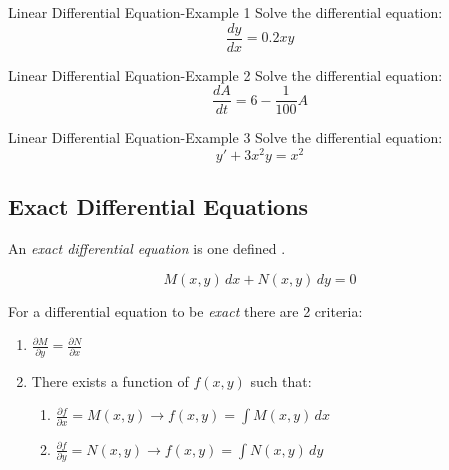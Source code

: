 \begin{example}[]{Linear Differential Equation-Example 1}
  Solve the differential equation:
  \begin{equation*}
    \frac{dy}{dx} = 0.2 xy
  \end{equation*}

  \tcblower

\end{example}

\begin{example}[]{Linear Differential Equation-Example 2}
  Solve the differential equation:
  \begin{equation*}
    \frac{dA}{dt} = 6 - \frac{1}{100} A
  \end{equation*}

  \tcblower

\end{example}

\begin{example}[]{Linear Differential Equation-Example 3}
  Solve the differential equation:
  \begin{equation*}
    y' + 3x^{2} y = x^{2}
  \end{equation*}

  \tcblower

\end{example}

\subsection{Exact Differential Equations} \label{subsec:Exact ODEs}
\begin{definition} \label{def:Exact ODE}
  An \emph{exact differential equation} is one defined .

  \begin{equation} \label{eq:Exact ODE}
    M(x,y) \, dx + N(x,y) \, dy = 0
  \end{equation}

  For a differential equation to be \emph{exact} there are 2 criteria:
  \begin{enumerate}
    \item $\frac{\partial M}{\partial y} = \frac{\partial N}{\partial x}$
    \item There exists a function of $f(x,y)$ such that:
      \begin{enumerate}
        \item $\frac{\partial f}{\partial x} = M(x,y) \rightarrow f(x,y) = \int M(x,y) \, dx$
        \item $\frac{\partial f}{\partial y} = N(x,y) \rightarrow f(x,y) = \int N(x,y) \, dy$
      \end{enumerate}
  \end{enumerate}
\end{definition}
